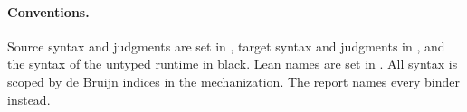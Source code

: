 \paragraph{Conventions.}
Source syntax and judgments are set in , target syntax and judgments in , and the syntax of the untyped runtime in black. Lean names are set in . All syntax is scoped by de Bruijn indices in the mechanization. The report names every binder instead.
